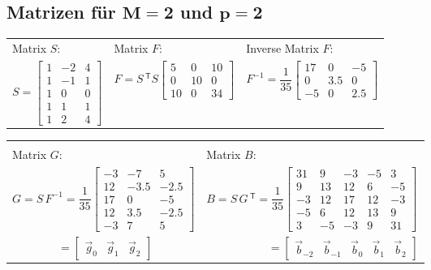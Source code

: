 	\subsection{Matrizen für $\bm{M=2}$ und $\bm{p=2}$}
		\begin{tabularx}{\textwidth}{>{\centering\arraybackslash}X|>{\centering\arraybackslash}X|>{\centering\arraybackslash}X}
		 Matrix $S$: & Matrix $F$: & Inverse Matrix $F$:\\[0.2cm]
		 $S = \begin{bmatrix}1 & -2& 4\\1 & -1& 1\\1 & 0& 0\\1 & 1& 1\\1 & 2& 4\end{bmatrix}$&
		 $F = S\,^{\mathsf T}S \begin{bmatrix}5 & 0 & 10\\ 0 & 10 & 0\\ 10 &0 & 34\end{bmatrix}$&$F^{-1} =\dfrac{1}{35} \begin{bmatrix}17 & 0 & -5\\ 0 & 3.5 & 0\\ -5 &0 & 2.5\end{bmatrix}$\\[1.2cm]
		 \hline
		\end{tabularx}
		\begin{tabularx}{\textwidth}{>{\centering\arraybackslash}X|>{\centering\arraybackslash}X}
		 &\\[-0.2cm]
		 Matrix $G$: & Matrix $B$: \\[0.2cm]
		 $G = S\,F^{-1} = \dfrac{1}{35}\begin{bmatrix}-3 & -7 & 5\\ 12 & -3.5 & -2.5 \\ 17 & 0 & -5 \\12 & 3.5 & -2.5 \\ -3 & 7 & 5\end{bmatrix}$
		 & $B = S\,G\,^{\mathsf T} =\dfrac{1}{35}\begin{bmatrix} 31 & 9 & -3 & -5 & 3 \\ 9 & 13 & 12 & 6 & -5 \\ -3 & 12 & 17 & 12 & -3 \\ -5 & 6 & 12 & 13 & 9 \\ 3 & -5 & -3 & 9 & 31 \end{bmatrix}$\\[1.1cm]
		 $\qquad\qquad = \begin{bmatrix}\vec g_0 &\vec g_1 &\vec g_2 \end{bmatrix}$ & $\qquad\qquad\;\;\;\;\; = \begin{bmatrix}\vec b_{-2} &\vec b_{-1} &\vec b_0 &\vec b_1 &\vec b_2 \end{bmatrix}$\\[0.3cm]
		 \hline
		\end{tabularx}\\[0.2cm]

